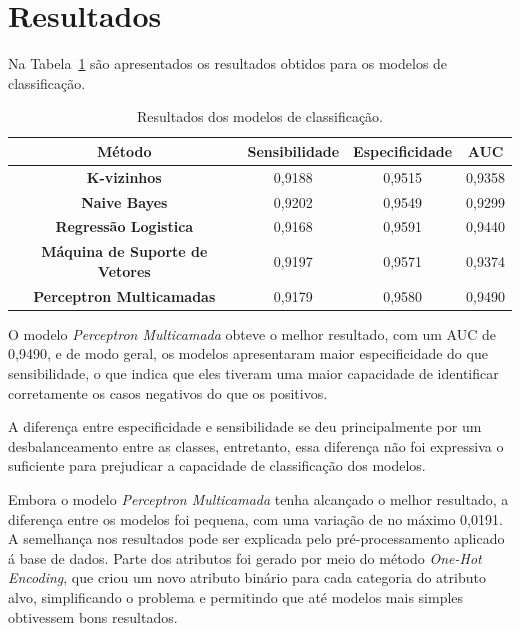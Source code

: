 \section{Resultados}

Na Tabela~\ref{table:results} são apresentados os resultados obtidos para os modelos de classificação.

\begin{table}[!t]
    \renewcommand{\arraystretch}{1.3}
    \caption{Resultados dos modelos de classificação.}
    \label{table:results}
    \centering
    \begin{tabular}{|c||c||c||c|}
        \hline
        \textbf{Método}                        & \textbf{Sensibilidade} & \textbf{Especificidade} & \textbf{AUC} \\ \hline
        \textbf{K-vizinhos}                    & 0,9188                 & 0,9515                  & 0,9358       \\ \hline
        \textbf{Naive Bayes}                   & 0,9202                 & 0,9549                  & 0,9299       \\ \hline
        \textbf{Regressão Logistica}           & 0,9168                 & 0,9591                  & 0,9440       \\ \hline
        \textbf{Máquina de Suporte de Vetores} & 0,9197                 & 0,9571                  & 0,9374       \\ \hline
        \textbf{Perceptron Multicamadas}       & 0,9179                 & 0,9580                  & 0,9490       \\ \hline
    \end{tabular}
\end{table}

O modelo \textit{Perceptron Multicamada} obteve o melhor resultado, com um AUC de 0,9490, e de modo geral, os modelos apresentaram maior especificidade do que sensibilidade, o que indica que eles tiveram uma maior capacidade de identificar corretamente os casos negativos do que os positivos.

A diferença entre especificidade e sensibilidade se deu principalmente por um desbalanceamento entre as classes, entretanto, essa diferença não foi expressiva o suficiente para prejudicar a capacidade de classificação dos modelos.

Embora o modelo \textit{Perceptron Multicamada} tenha alcançado o melhor resultado, a diferença entre os modelos foi pequena, com uma variação de no máximo 0,0191. A semelhança nos resultados pode ser explicada pelo pré-processamento aplicado á base de dados. Parte dos atributos foi gerado por meio do método \textit{One-Hot Encoding}, que criou um novo atributo binário para cada categoria do atributo alvo, simplificando o problema e permitindo que até modelos mais simples obtivessem bons resultados.